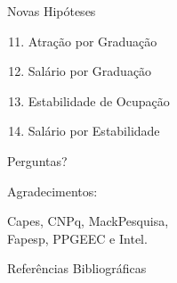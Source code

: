 \documentclass[10pt, hyperref={pdfpagelabels=false, unicode=true}, aspectratio=169]{beamer}
\begin{document}
\begin{frame}[label=hipoteses-novas]{Novas Hipóteses}
  \begin{enumerate}
    \setcounter{enumi}{10}
    \item Atração por Graduação
    \item Salário por Graduação
    \item Estabilidade de Ocupação
    \item Salário por Estabilidade
  \end{enumerate}
\end{frame}

{
\begin{frame}[standout]
  \Large
  Perguntas?
  
  \normalsize
  \vspace{2\baselineskip}
  Agradecimentos:
  
  \vspace{0.5\baselineskip}
  Capes, CNPq, MackPesquisa,\\
   Fapesp, PPGEEC e Intel.
\end{frame}
}

\appendix

\begin{frame}[allowframebreaks]{Referências Bibliográficas}

  
  

\end{frame}
\end{document}
